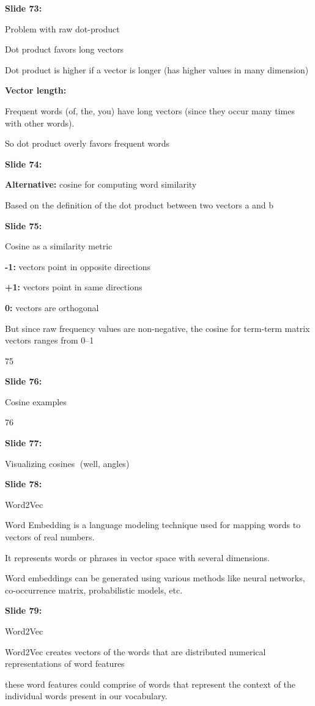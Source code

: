 \documentclass[11pt,a4paper]{article}
\begin{document}
\textbf{Slide 73:}

Problem with raw dot-product

Dot product favors long vectors

Dot product is higher if a vector is longer (has higher values in many dimension)

\textbf{Vector length:} 

Frequent words (of, the, you) have long vectors (since they occur many times with other words).

So dot product overly favors frequent words

\textbf{Slide 74:}

\textbf{Alternative:}  cosine for computing word similarity

Based on the definition of the dot product between two vectors a and b

\textbf{Slide 75:}

Cosine as a similarity metric

\textbf{-1:}  vectors point in opposite directions

\textbf{+1:}   vectors point in same directions

\textbf{0:}  vectors are orthogonal

But since raw frequency values are non-negative, the cosine for term-term matrix vectors ranges from 0–1

75

\textbf{Slide 76:}

Cosine examples

76

\textbf{Slide 77:}

Visualizing cosines (well, angles)

\textbf{Slide 78:}

Word2Vec

Word Embedding is a language modeling technique used for mapping words to vectors of real numbers.

It represents words or phrases in vector space with several dimensions.

Word embeddings can be generated using various methods like neural networks, co-occurrence matrix, probabilistic models, etc.

\textbf{Slide 79:}

Word2Vec

Word2Vec creates vectors of the words that are distributed numerical representations of word features

these word features could comprise of words that represent the context of the individual words present in our vocabulary.
\end{document}

